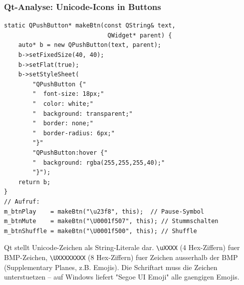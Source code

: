 \subsubsection{Qt-Analyse: Unicode-Icons in Buttons}

\begin{lstlisting}[caption={makeBtn: Emoji-Symbole als Button-Texte}]
static QPushButton* makeBtn(const QString& text,
                             QWidget* parent) {
    auto* b = new QPushButton(text, parent);
    b->setFixedSize(40, 40);
    b->setFlat(true);
    b->setStyleSheet(
        "QPushButton {"
        "  font-size: 18px;"
        "  color: white;"
        "  background: transparent;"
        "  border: none;"
        "  border-radius: 6px;"
        "}"
        "QPushButton:hover {"
        "  background: rgba(255,255,255,40);"
        "}");
    return b;
}
// Aufruf:
m_btnPlay    = makeBtn("\u23f8", this);  // Pause-Symbol
m_btnMute    = makeBtn("\U0001f507", this); // Stummschalten
m_btnShuffle = makeBtn("\U0001f500", this); // Shuffle
\end{lstlisting}

Qt stellt Unicode-Zeichen als String-Literale dar.
\verb|\uXXXX| (4 Hex-Ziffern) fuer BMP-Zeichen,
\verb|\UXXXXXXXX| (8 Hex-Ziffern) fuer Zeichen
ausserhalb der BMP (Supplementary Planes, z.B. Emojis).
Die Schriftart muss die Zeichen unterstuetzen --
auf Windows liefert "Segoe UI Emoji" alle gaengigen Emojis.
